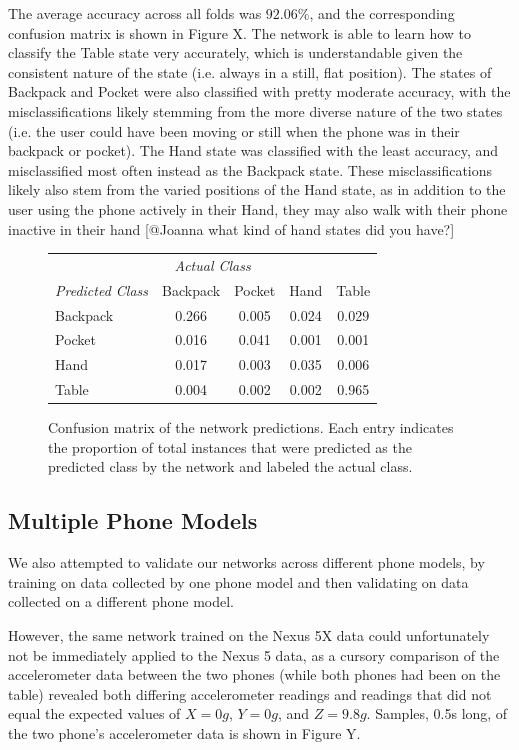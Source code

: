 The average accuracy across all folds was $92.06\%$, and the corresponding
confusion matrix is shown in Figure X. The network is able to learn how to 
classify the Table state very accurately, which is understandable given 
the consistent nature of the state (i.e. always in a still, flat position). The states
of Backpack and Pocket were also classified with pretty moderate accuracy,
with the misclassifications likely stemming from the more diverse nature of 
the two states (i.e. the user could have been moving or still when the phone was
in their backpack or pocket). The Hand state was classified with the least accuracy,
and misclassified most often instead as the Backpack state. These misclassifications
likely also stem from the varied positions of the Hand state, as in addition to the user
using the phone actively in their Hand, they may also walk with their phone inactive
in their hand [@Joanna what kind of hand states did you have?]

 \begin{figure}[t]
 \center
\begin{tabular}{| l || c | c | c | c |}  
\toprule
\multicolumn{5}{c}{\textit{Actual Class}} \\ \cmidrule{2-5}
\textit{Predicted Class}		&	Backpack    & 	Pocket 	& 	Hand	&	Table \\
\midrule
Backpack			&	0.266 	&	0.005	&	0.024 	&	0.029 \\
Pocket			&	0.016 	&	0.041 	&	0.001 	&	0.001 \\
Hand			&	0.017 	&	0.003 	&	0.035 	&	0.006 \\
Table			&	0.004 	&	0.002 	&	0.002 	&	0.965\\
\bottomrule
\end{tabular}

\caption{Confusion matrix of the network predictions. Each entry indicates the proportion of
total instances that were predicted as the predicted class by the network and labeled the actual class.}
\centering
\label{fig:confusion}
\end{figure}  


\subsection{Multiple Phone Models}
We also attempted to validate our networks across different phone models, by training
on data collected by one phone model and then validating on data collected on a 
different phone model. 

However, the same network trained on the Nexus 5X data could unfortunately not be immediately
applied to the Nexus 5 data, as a cursory comparison of the accelerometer data between the two phones 
(while both phones had been on the table) revealed both differing accelerometer readings and readings
that did not equal the expected values of $X = 0g$, $Y = 0g$, and $Z = 9.8g$. Samples, 0.5s long, of 
the two phone's accelerometer data is shown in Figure Y. 

